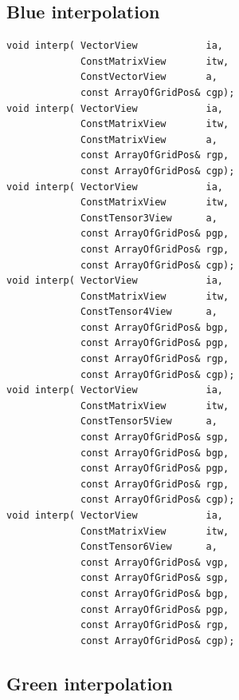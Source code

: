 \subsection{Blue interpolation}

{\small
\begin{verbatim}
void interp( VectorView            ia,
             ConstMatrixView       itw,
             ConstVectorView       a,    
             const ArrayOfGridPos& cgp);
void interp( VectorView            ia,
             ConstMatrixView       itw,
             ConstMatrixView       a,    
             const ArrayOfGridPos& rgp,
             const ArrayOfGridPos& cgp);
void interp( VectorView            ia,
             ConstMatrixView       itw,
             ConstTensor3View      a,    
             const ArrayOfGridPos& pgp,
             const ArrayOfGridPos& rgp,
             const ArrayOfGridPos& cgp);
void interp( VectorView            ia,
             ConstMatrixView       itw,
             ConstTensor4View      a,    
             const ArrayOfGridPos& bgp,
             const ArrayOfGridPos& pgp,
             const ArrayOfGridPos& rgp,
             const ArrayOfGridPos& cgp);
void interp( VectorView            ia,
             ConstMatrixView       itw,
             ConstTensor5View      a,    
             const ArrayOfGridPos& sgp,
             const ArrayOfGridPos& bgp,
             const ArrayOfGridPos& pgp,
             const ArrayOfGridPos& rgp,
             const ArrayOfGridPos& cgp);
void interp( VectorView            ia,
             ConstMatrixView       itw,
             ConstTensor6View      a,    
             const ArrayOfGridPos& vgp,
             const ArrayOfGridPos& sgp,
             const ArrayOfGridPos& bgp,
             const ArrayOfGridPos& pgp,
             const ArrayOfGridPos& rgp,
             const ArrayOfGridPos& cgp);
\end{verbatim}
}

\subsection{Green interpolation}

